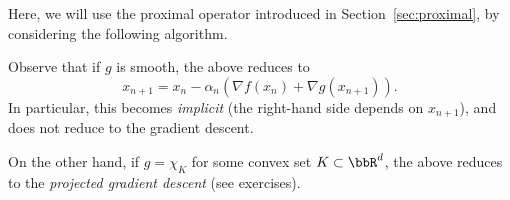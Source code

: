  
     Here, we will use the proximal operator introduced in Section~\ref{sec:proximal}, by considering the following algorithm.
 
 
     \begin{remark}
         Observe that if $g$ is smooth, the above reduces to
         \begin{equation}
             x_{n+1} =  x_n - \alpha_n\left( \nabla f(x_n) + \nabla g(x_{n+1})\right).
         \end{equation}
         In particular, this becomes \emph{implicit} (the right-hand side depends on $x_{n+1}$), and does not reduce to the gradient descent.
 
         On the other hand, if $g=\chi_K$ for some convex set $K\subset \bbR^d$, the above reduces to the \emph{projected gradient descent} (see exercises).
     \end{remark}
 
